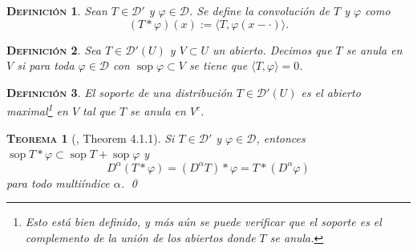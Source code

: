 \documentclass[11pt]{article}
\theoremstyle{colored}
\DeclareMathOperator{\sop}{sop}
\newtheorem{definition}{\scshape Definición}
\newtheorem{theorem}{\scshape Teorema}
\newcommand{\test}{\mathscr{D}}
\newcommand{\dist}{\test'}
\newcommand{\ev}[1]{\langle #1 \rangle}
\begin{document}
\begin{definition} Sean $T \in \dist$ y $\varphi \in \test$. Se define la \textit{convolución} de $T$ y $\varphi$ como
\[
(T \ast \varphi)(x) := \ev{T,\varphi(x - \cdot)}.
\]
\end{definition}

\begin{definition} Sea $T \in \dist(U)$ y $V \subset U$ un abierto. Decimos que $T$ se anula en $V$ si para toda $\varphi \in \test$ con $\sop \varphi \subset V$ se tiene que $\ev{T,\varphi} = 0$.
\end{definition}

\begin{definition} El \textit{soporte} de una distribución $T \in \dist(U)$ es el abierto maximal\footnote{Esto está bien definido, y más aún se puede verificar que el soporte es el complemento de la unión de los abiertos donde $T$ se anula.} en $V$ tal que $T$ se anula en $V^c$. 
\end{definition}

\begin{theorem}[\cite{H}, Theorem 4.1.1]  Si $T \in \dist$ y $\varphi \in \test$, entonces $\sop T \ast \varphi \subset \sop T + \sop \varphi$ y
\[
D^\alpha (T \ast \varphi ) = (D^\alpha T) \ast \varphi = T \ast (D^\alpha \varphi)
\]
para todo multiíndice $\alpha$. \qed
\end{theorem}

\scshape
\begin{thebibliography}{}
\normalfont
{}
\end{thebibliography}
\end{document}
